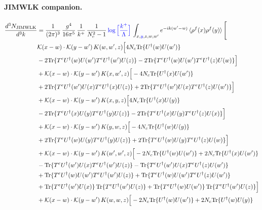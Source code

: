 \documentclass[10pt]{article}
\numberwithin{equation}{section}
\newcommand{\new}[1]{{\color{blue}#1}}
\begin{document}
\paragraph{JIMWLK companion.}
\begin{align}
    \frac{d^{3}N_{\mathrm{JIMWLK}}}{d^{3}k} & = \frac{1}{(2\pi)^{3}}\,\frac{g^{4}}{16\pi^{5}}\,\frac{1}{k^{+}}\,\frac{1}{N^{2}_{c}-1}\,\new{\log\Big[\frac{k^{+}}{\Lambda}\Big]}\,\int_{x,\new{y},z,w,w'}e^{-ik(w'-w)}\,\langle\rho^{f}(x)\rho^{f}(y) \rangle\,\Bigg[\notag \\ & \mathcal K(x-w)\cdot\mathcal K(y-w')\,K(w,w',z)\Big[4 N_{c}{\rm Tr}\{U^\dagger(w)U(w')\}\notag\\
&-2{\rm Tr}\{T^eU^\dagger(w)U(w')T^eU^\dagger(w')U(z)\}-2{\rm Tr}\{T^eU^\dagger(w)U(w')T^eU^\dagger(z)U(w)\}\Big]\notag\\
&+\mathcal K(x-w)\cdot\mathcal K(y-w')\,K(x,w',z)\Big[-4 N_{c}{\rm Tr}\{U^\dagger(x)U(w')\}\notag\\
&+2{\rm Tr}\{T^eU^\dagger(w')U(x)T^eU^\dagger(x)U(z)\}+2{\rm Tr}\{T^eU^\dagger(w')U(x)T^eU^\dagger(z)U(w')\}\Big]\notag\\
&+\mathcal K(x-w)\cdot\mathcal K(y-w')\,K(x,y,z)\Big[4 N_{c}{\rm Tr}\{U^\dagger(x)U(y)\}\notag\\
&-2{\rm Tr}\{T^eU^\dagger(x)U(y)T^eU^\dagger(y)U(z)\}-2{\rm Tr}\{T^eU^\dagger(x)U(y)T^eU^\dagger(z)U(x)\}\Big]\notag\\
&+\mathcal K(x-w)\cdot\mathcal K(y-w')\,K(y,w,z)\Big[-4 N_{c}{\rm Tr}\{U^\dagger(w)U(y)\}\notag\\
&+2{\rm Tr}\{T^eU^\dagger(w)U(y)T^eU^\dagger(y)U(z)\}+2{\rm Tr}\{T^eU^\dagger(w)U(y)T^eU^\dagger(z)U(w)\}\Big]\notag\\
&+\mathcal K(x-w)\cdot\mathcal K(y-w')\,K(w',w',z)\Big[-2 N_{c}{\rm Tr}\{U^\dagger(w)U(w')\}+2 N_{c}{\rm Tr}\{U^\dagger(x)U(w')\}\notag\\
&-{\rm Tr}\{T^eU^\dagger(w')U(x)T^eU^\dagger(w')U(z)\}-{\rm Tr}\{T^eU^\dagger(w')U(x)T^eU^\dagger(z)U(w')\}\notag\\
&+{\rm Tr}\{T^eU^\dagger(w)U(w')T^eU^\dagger(w')U(z)\}+{\rm Tr}\{T^eU^\dagger(w)U(w')T^eU^\dagger(z)U(w')\}\notag\\
&+{\rm Tr}\{T^eU^\dagger(w')U(x)\}\,{\rm Tr}\{T^eU^\dagger(w')U(z)\}+{\rm Tr}\{T^eU^\dagger(w)U(w')\}\,{\rm Tr}\{T^eU^\dagger(w')U(z)\}\Big]\notag\\
&+\mathcal K(x-w)\cdot\mathcal K(y-w')\,K(w,w,z)\Big[-2 N_{c}{\rm Tr}\{U^\dagger(w)U(w')\}+2 N_{c}{\rm Tr}\{U^\dagger(w)U(y)\}\notag\\

\end{align}
\end{document}
